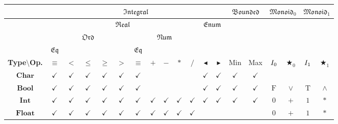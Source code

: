 \documentclass{jsarticle}
\newcommand{\typeclassname}[1]{\mathfrak{#1}}
\newcommand{\typeclassbounded}{\typeclassname{Bounded}}
\newcommand{\typeclassenum}{\typeclassname{Enum}}
\newcommand{\typeclasseq}{\typeclassname{Eq}}
\newcommand{\typeclassintegral}{\typeclassname{Integral}}
\newcommand{\typeclassmonoid}{\typeclassname{Monoid}}
\newcommand{\typeclassnum}{\typeclassname{Num}}
\newcommand{\typeclassord}{\typeclassname{Ord}}
\newcommand{\typeclassreal}{\typeclassname{Real}}
\newcommand{\typename}[1]{\mathbf{#1}}
\newcommand{\typebool}{\typename{Bool}}
\newcommand{\typechar}{\typename{Char}}
\newcommand{\typeint}{\typename{Int}}
\newcommand{\typefloat}{\typename{Float}}
\newcommand{\constantname}[1]{\mathrm{#1}}
\newcommand{\constanttrue}{\constantname{T}}
\newcommand{\constantfalse}{\constantname{F}}
\newcommand{\identity}{\mathnormal{I}}
\newcommand{\unarypred}{\blacktriangleleft}
\newcommand{\unarysucc}{\blacktriangleright}
\newcommand{\binaryeq}{\equiv}
\newcommand{\binaryl}{<}
\newcommand{\binaryle}{\le}
\newcommand{\binaryge}{\ge}
\newcommand{\binaryg}{>}
\newcommand{\binaryadd}{+}
\newcommand{\binarysub}{-}
\newcommand{\binarymultiply}{*}
\newcommand{\binarydivide}{/}
\newcommand{\binaryany}{\bigstar}
\newcommand{\binaryor}{\vee}
\newcommand{\binaryand}{\wedge}
\newcommand{\identity}{I}
\begin{document}
\begin{center}
\begin{tabular}{||c||c|c|c|c|c|c|c|c|c|c|c|c|c|c|c|c|c|c||}
\hline
{ }
    &\multicolumn{12}{|c|}{$\typeclassintegral$}
    &\multicolumn{2}{|c|}{$\typeclassbounded$}
    &\multicolumn{2}{|c|}{$\typeclassmonoid_0$}
    &\multicolumn{2}{|c||}{$\typeclassmonoid_1$}\\
\hline
{ }
    &\multicolumn{10}{|c|}{$\typeclassreal$}
    &\multicolumn{2}{|c|}{$\typeclassenum$}
    &\multicolumn{2}{|c|}{ }
    &\multicolumn{2}{|c|}{ }
    &\multicolumn{2}{|c||}{ }\\
\hline
{ }
    &\multicolumn{5}{|c|}{$\typeclassord$}
    &\multicolumn{5}{|c|}{$\typeclassnum$}
    &\multicolumn{2}{|c|}{ }
    &\multicolumn{2}{|c|}{ }
    &\multicolumn{2}{|c|}{ }
    &\multicolumn{2}{|c||}{ }\\
\hline
{ }
    &$\typeclasseq$
    &\multicolumn{4}{|c|}{ }
    &$\typeclasseq$
    &\multicolumn{4}{|c|}{ }
    &\multicolumn{2}{|c|}{ }
    &\multicolumn{2}{|c|}{ }
    &\multicolumn{2}{|c|}{ }
    &\multicolumn{2}{|c||}{ }\\
\hline
\textbf{Type$\setminus$Op.}
    &$\binaryeq$
    &$\binaryl$
    &$\binaryle$
    &$\binaryge$
    &$\binaryg$
    &$\binaryeq$
    &$\binaryadd$
    &$\binarysub$
    &$\binarymultiply$
    &$\binarydivide$
    &$\unarypred$
    &$\unarysucc$
    &Min
    &Max
    &$\identity_0$
    &$\binaryany_0$
    &$\identity_1$
    &$\binaryany_1$\\
\hline\hline
$\typechar$
    &$\checkmark$
    &$\checkmark$
    &$\checkmark$
    &$\checkmark$
    &$\checkmark$
    &$\checkmark$
    &
    &
    &
    &
    &$\checkmark$
    &$\checkmark$
    &$\checkmark$
    &$\checkmark$
    &
    &
    &
    &\\
\hline
$\typebool$
    &$\checkmark$
    &$\checkmark$
    &$\checkmark$
    &$\checkmark$
    &$\checkmark$
    &$\checkmark$
    &
    &
    &
    &
    &$\checkmark$
    &$\checkmark$
    &$\checkmark$
    &$\checkmark$
    &$\constantfalse$
    &$\binaryor$
    &$\constanttrue$
    &$\binaryand$\\
\hline
$\typeint$
    &$\checkmark$
    &$\checkmark$
    &$\checkmark$
    &$\checkmark$
    &$\checkmark$
    &$\checkmark$
    &$\checkmark$
    &$\checkmark$
    &$\checkmark$
    &$\checkmark$
    &$\checkmark$
    &$\checkmark$
    &$\checkmark$
    &$\checkmark$
    &$0$
    &$\binaryadd$
    &$1$
    &$\binarymultiply$\\
\hline
$\typefloat$
    &$\checkmark$
    &$\checkmark$
    &$\checkmark$
    &$\checkmark$
    &$\checkmark$
    &$\checkmark$
    &$\checkmark$
    &$\checkmark$
    &$\checkmark$
    &$\checkmark$
    &
    &
    &
    &
    &$0$
    &$\binaryadd$
    &$1$
    &$\binarymultiply$\\
\hline
\end{tabular}
\end{center}
\end{document}
